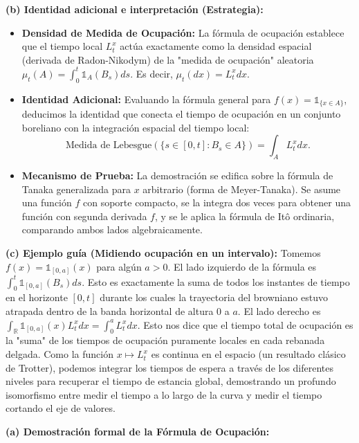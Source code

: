 \documentclass[11pt, letterpaper]{article}
\begin{document}
\begin{solucion}
    \textbf{(b) Identidad adicional e interpretación (Estrategia):}
    \begin{itemize}
        \item[(i)] \textbf{Densidad de Medida de Ocupación:} La fórmula de ocupación establece que el tiempo local $L_t^x$ actúa exactamente como la densidad espacial (derivada de Radon-Nikodym) de la "medida de ocupación" aleatoria $\mu_t(A) = \int_0^t \mathbb{1}_A(B_s)ds$. Es decir, $\mu_t(dx) = L_t^x dx$.
        \item[(ii)] \textbf{Identidad Adicional:} Evaluando la fórmula general para $f(x) = \mathbb{1}_{\{x \in A\}}$, deducimos la identidad que conecta el tiempo de ocupación en un conjunto boreliano con la integración espacial del tiempo local:
        \[ \text{Medida de Lebesgue}(\{s \in [0,t] : B_s \in A\}) = \int_A L_t^x dx. \]
        \item[(iii)] \textbf{Mecanismo de Prueba:} La demostración se edifica sobre la fórmula de Tanaka generalizada para $x$ arbitrario (forma de Meyer-Tanaka). Se asume una función $f$ con soporte compacto, se la integra dos veces para obtener una función con segunda derivada $f$, y se le aplica la fórmula de Itô ordinaria, comparando ambos lados algebraicamente.
    \end{itemize}

    \vspace{3mm}
    \textbf{(c) Ejemplo guía (Midiendo ocupación en un intervalo):}
    Tomemos $f(x) = \mathbb{1}_{[0,a]}(x)$ para algún $a>0$. 
    El lado izquierdo de la fórmula es $\int_0^t \mathbb{1}_{[0,a]}(B_s)ds$. Esto es exactamente la suma de todos los instantes de tiempo en el horizonte $[0,t]$ durante los cuales la trayectoria del browniano estuvo atrapada dentro de la banda horizontal de altura $0$ a $a$.
    El lado derecho es $\int_{\mathbb{R}} \mathbb{1}_{[0,a]}(x) L_t^x dx = \int_0^a L_t^x dx$. 
    Esto nos dice que el tiempo total de ocupación es la "suma" de los tiempos de ocupación puramente locales en cada rebanada delgada. Como la función $x \mapsto L_t^x$ es continua en el espacio (un resultado clásico de Trotter), podemos integrar los tiempos de espera a través de los diferentes niveles para recuperar el tiempo de estancia global, demostrando un profundo isomorfismo entre medir el tiempo a lo largo de la curva y medir el tiempo cortando el eje de valores.

    \vspace{3mm}
    \textbf{(a) Demostración formal de la Fórmula de Ocupación:}
    

\end{solucion}
\end{document}
